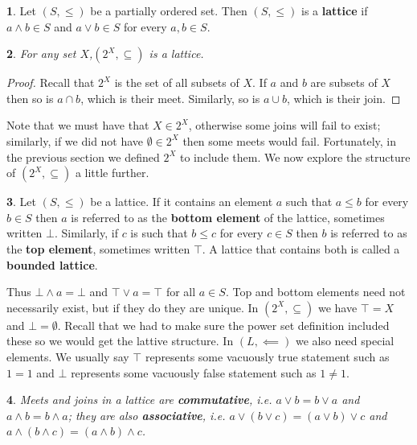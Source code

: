 \documentclass[oneside,english]{amsbook}
\numberwithin{section}{chapter}
\theoremstyle{plain}
\newtheorem{thm}{\protect\theoremname}
\theoremstyle{definition}
\newtheorem{defn}[thm]{\protect\definitionname}
\providecommand{\definitionname}{Definition}
\providecommand{\theoremname}{Theorem}
\begin{document}
\begin{defn} 
	Let $(S,\le)$ be a partially ordered set. Then $(S,\le)$ is a \textbf{lattice} if $a\land b\in S$ and $a\lor b\in S$ for every $a,b\in S$.
\end{defn} 

\begin{thm} 
	For any set \emph{$X$},$(2^{X},\subseteq)$ is a lattice.
\end{thm} 

\begin{proof} 
	Recall that $2^{X}$ is the set of all subsets of $X$. If $a$ and $b$ are subsets of $X$ then so is $a\cap b$, which is their meet. Similarly, so is $a\cup b$, which is their join.  
\end{proof} 

Note that we must have that $X\in2^{X}$, otherwise some joins will fail to exist; similarly, if we did not have $\emptyset\in2^{X}$ then some meets would fail. Fortunately, in the previous section we defined $2^{X}$ to include them. We now explore the structure of $(2^{X},\subseteq)$ a little further. 

\begin{defn} 
	Let $(S,\le)$ be a lattice. If it contains an element $a$ such that $a\le b$ for every $b\in S$ then $a$ is referred to as the \textbf{bottom element} of the lattice, sometimes written $\bot$. Similarly, if $c$ is such that $b\le c$ for every $c\in S$ then $b$ is referred to as the \textbf{top element}, sometimes written $\top$. A lattice that contains both is called a \textbf{bounded lattice}. 
\end{defn} 

Thus $\bot\land a=\bot$ and $\top\lor a=\top$ for all $a\in S$. Top and bottom elements need not necessarily exist, but if they do they are unique. In $(2^{X},\subseteq)$ we have $\top=X$ and $\bot=\emptyset$. Recall that we had to make sure the power set definition included these so we would get the lattive structure. In $(L,\impliedby)$ we also need special elements. We usually say $\top$ represents some vacuously true statement such as $1=1$ and $\bot$ represents some vacuously false statement such as $1\ne1$. 

\begin{thm} 
	Meets and joins in a lattice are \textbf{commutative}, i.e. $a\lor b=b\lor a$ and $a\land b=b\land a$; they are also \textbf{associative}, i.e. $a\lor(b\lor c)=(a\lor b)\lor c$ and $a\land(b\land c)=(a\land b)\land c$. 
\end{thm} 
\end{document}
